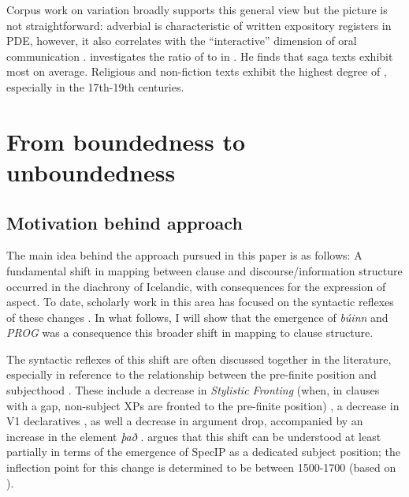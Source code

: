 \documentclass[output=paper,colorlinks,citecolor=brown]{langscibook}
\begin{document}
Corpus work on  variation broadly supports this general view but the picture is not straightforward: adverbial  is characteristic of written expository registers in PDE, however, it also correlates with the ``interactive'' dimension of oral communication \citep{biber2005register}. \citet{walkden2021parataxis} investigates the ratio of  to  in . He finds that saga texts exhibit most  on average. Religious and non-fiction texts exhibit the highest degree of , especially in the 17th-19th centuries.

\section{From boundedness to unboundedness}\label{sec:Chark4}

\subsection{Motivation behind approach}\label{sec:Chark4.1}
The main idea behind the approach pursued in this paper is as follows: A fundamental shift in mapping between clause and discourse/information structure occurred in the diachrony of Icelandic, with consequences for the expression of aspect. To date, scholarly work in this area has focused on the syntactic reflexes of these changes \citep{holmberg2000scandinavian, sigurdsson2018icelandic, hroarsdottir2000word, booth2018, booth-beck20200jhs}. In what follows, I will show that the emergence of \textit{búinn} and \textit{PROG} was a consequence this broader shift in mapping to clause structure. 

The syntactic reflexes of this shift are often discussed together in the literature, especially in reference to the relationship between the pre-finite position and subjecthood \citep{jonsson1992, barddal-eythorsson03, booth-beck20200jhs}. These include a decrease in \textit{Stylistic Fronting} (when, in clauses with a gap, non-subject XPs are fronted to the pre-finite position) \citep{holmberg2000scandinavian}, a decrease in V1 declaratives \citep{sigurdsson2018icelandic,booth-beck20200jhs}, as well a decrease in argument drop, accompanied by an increase in the  element \textit{það} \citep{rognvaldsson1995old, rognvaldsson2002thadh, booth2018}. \citet{booth_revisiting_2021} argues that this shift can be understood at least partially in terms of the emergence of SpecIP as a dedicated subject position; the inflection point for this change is determined to be between 1500-1700 (based on ).
\end{document}
